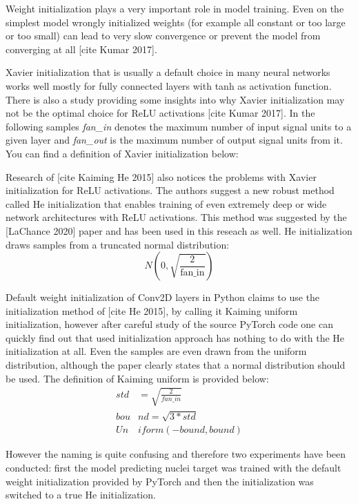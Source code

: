 Weight initialization plays a very important role in model training. Even on the simplest model wrongly initialized weights (for example all constant or too large or too small) can lead to very slow convergence or prevent the model from converging at all [cite Kumar 2017].

Xavier initialization that is usually a default choice in many neural networks works well mostly for fully connected layers with tanh as activation function. There is also a study providing some insights into why Xavier initialization may not be the optimal choice for ReLU activations [cite Kumar 2017]. In the following samples \textit{fan\_in} denotes the maximum number of input signal units to a given layer and \textit{fan\_out} is the maximum number of output signal units from it. You can find a definition of Xavier initialization below:

Research of [cite Kaiming He 2015] also notices the problems with Xavier initialization for ReLU activations. The authors suggest a new robust method called He initialization that enables training of even extremely deep or wide network architectures with ReLU activations. This method was suggested by the [LaChance 2020] paper and has been used in this reseach as well. He initialization draws samples from a truncated normal distribution:
\begin{equation}
	N(0, \sqrt{\frac{2}{\text{fan\_in}}})
\end{equation}

Default weight initialization of Conv2D layers in Python claims to use the initialization method of [cite He 2015], by calling it Kaiming uniform initialization, however after careful study of the source PyTorch code one can quickly find out that used initialization approach has nothing to do with the He initialization at all. Even the samples are even drawn from the uniform distribution, although the paper clearly states that a normal distribution should be used. The definition of Kaiming uniform is provided below:
		\begin{align}
			std &= \sqrt{\frac{2}{fan\_in}} \\
			bou&nd = \sqrt{3 * std} \\
			Un&iform(-bound, bound)
		\end{align}

However the naming is quite confusing and therefore two experiments have been conducted: first the model predicting nuclei target was trained with the default weight initialization provided by PyTorch and then the initialization was switched to a true He initialization. 

